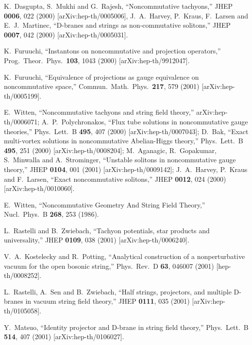 \documentclass[a4paper,12pt]{article}
\begin{document}
\begin{thebibliography}{999}
K.~Dasgupta, S.~Mukhi and G.~Rajesh,
``Noncommutative tachyons,''
JHEP {\bf 0006}, 022 (2000)
[arXiv:hep-th/0005006],
J.~A.~Harvey, P.~Kraus, F.~Larsen and E.~J.~Martinec,
``D-branes and strings as non-commutative solitons,''
JHEP {\bf 0007}, 042 (2000)
[arXiv:hep-th/0005031].





K.~Furuuchi,
``Instantons on noncommutative \coordHE{} and projection operators,''
Prog.\ Theor.\ Phys.\  {\bf 103}, 1043 (2000)
[arXiv:hep-th/9912047].


K.~Furuuchi,
``Equivalence of projections as gauge equivalence on noncommutative space,''
Commun.\ Math.\ Phys.\  {\bf 217}, 579 (2001)
[arXiv:hep-th/0005199].

E.~Witten,
``Noncommutative tachyons and string field theory,''
arXiv:hep-th/0006071;
A.~P.~Polychronakos,
``Flux tube solutions in noncommutative gauge theories,''
Phys.\ Lett.\ B {\bf 495}, 407 (2000)
[arXiv:hep-th/0007043];
D.~Bak,
``Exact multi-vortex solutions in noncommutative Abelian-Higgs theory,''
Phys.\ Lett.\ B {\bf 495}, 251 (2000)
[arXiv:hep-th/0008204];
M.~Aganagic, R.~Gopakumar, S.~Minwalla and A.~Strominger,
``Unstable solitons in noncommutative gauge theory,''
JHEP {\bf 0104}, 001 (2001)
[arXiv:hep-th/0009142];
J.~A.~Harvey, P.~Kraus and F.~Larsen,
``Exact noncommutative solitons,''
JHEP {\bf 0012}, 024 (2000)
[arXiv:hep-th/0010060].


E.~Witten,
``Noncommutative Geometry And String Field Theory,''
Nucl.\ Phys.\ B {\bf 268}, 253 (1986).




L.~Rastelli and B.~Zwiebach,
``Tachyon potentials, star products and universality,''
JHEP {\bf 0109}, 038 (2001)
[arXiv:hep-th/0006240].

V.~A.~Kostelecky and R.~Potting,
``Analytical construction of a nonperturbative vacuum 
for the open  bosonic string,''
Phys.\ Rev.\ D {\bf 63}, 046007 (2001)
[hep-th/0008252].

L.~Rastelli, A.~Sen and B.~Zwiebach,
``Half strings, projectors, and multiple D-branes in 
vacuum string field  theory,''
JHEP {\bf 0111}, 035 (2001)
[arXiv:hep-th/0105058].


Y.~Matsuo,
``Identity projector and D-brane in string field theory,''
Phys.\ Lett.\ B {\bf 514}, 407 (2001)
[arXiv:hep-th/0106027].


\end{thebibliography}
\end{document}
